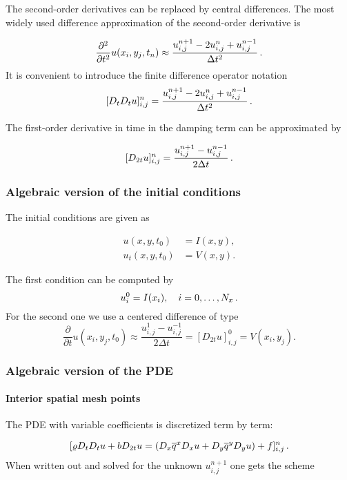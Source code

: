 \documentclass[letterpaper,10pt,english]{/usr/share/sphinx/texinputs/sphinxhowto}
\begin{document}
The second-order derivatives can be replaced by central differences. The
most widely used difference approximation of the second-order derivative
is

\[
\frac{\partial^2}{\partial t^2}u(x_i,y_j,t_n)\approx
\frac{u_{i,j}^{n+1} - 2u_{i,j}^n + u^{n-1}_{i,j}}{\Delta t^2}{\thinspace .}
\] It is convenient to introduce the finite difference operator notation
\[
[D_tD_t u]^n_{i,j} = \frac{u_{i,j}^{n+1} - 2u_{i,j}^n + u^{n-1}_{i,j}}{\Delta t^2}{\thinspace .}
\]

The first-order derivative in time in the damping term can be
approximated by

\[
[D_{2t} u]^n_{i,j} = \frac{u_{i,j}^{n+1} - u^{n-1}_{i,j}}  {2\Delta t}{\thinspace .}
\]\subsubsection{Algebraic version of the initial conditions}

The initial conditions are given as

\begin{align*}
u(x,y,t_0)&=I(x,y),\\
u_t(x,y,t_0)&=V(x,y).
\end{align*}

The first condition can be computed by \[
u_i^0 = I(x_i),\quad i=0,\ldots,N_x{\thinspace .}
\] For the second one we use a centered difference of type \[
\frac{\partial}{\partial t} u(x_i,y_j,t_0)\approx
\frac{u^1_{i,j} - u^{-1}_{i,j}}{2\Delta t} = [D_{2t} u]^0_{i,j} = V(x_i,y_j).
\]\subsubsection{Algebraic version of the PDE}

\paragraph{Interior spatial mesh points}

The PDE with variable coefficients is discretized term by term:

\[
[\varrho D_tD_t u + b D_{2t} u  = (D_x\overline{q}^x D_x u +
D_y\overline{q}^y D_yu ) + f]^n_{i,j}
\thinspace .
\] When written out and solved for the unknown $u^{n+1}_{i,j}$ one gets
the scheme
\end{document}
